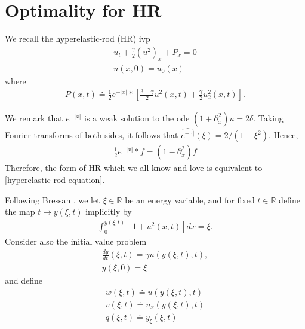 \documentclass[12pt,reqno]{amsart}
\numberwithin{equation}{section}  %
\numberwithin{figure}{section}
\newcommand{\rr}{\mathbb{R}}
\newcommand{\p}{\partial}
\begin{document}
\section{Optimality for HR} 
\label{sec:op-hr}
We recall the hyperelastic-rod (HR) ivp
\begin{gather}
    \label{hr}
    u_{t} + \frac{\gamma}{2}(u^{2})_{x} + P_{x} = 0
    \\
    \label{hr-data}
    u(x,0) = u_{0}(x)
\end{gather}
where
%
%
\begin{equation*}
\begin{split}
P(x,t) \doteq \frac{1}{2}e^{-| x |} * \left [\frac{3 - \gamma}{2}
    u^{2}(x,t) + \frac{\gamma}{2} u_{2}^{2}(x,t) \right ].
\end{split}
\end{equation*}
%
\begin{framed}
We remark that $e^{-| x |}$ is a weak solution to the ode $(1 + \p_{x}^{2})u =
2\delta$. Taking Fourier transforms of both sides, it follows that
$\widehat{e^{-| \cdot |}}(\xi) = 2/(1 + \xi^{2})$. Hence,
%
%
\begin{equation*}
\begin{split}
\frac{1}{2} e^{-| x |} * f = (1 - \p_{x}^2)f
\end{split}
\end{equation*}
%
%
Therefore, the form of HR which we all know and love is equivalent to
\eqref{hyperelastic-rod-equation}.
\end{framed}
%
Following Bressan \cite{Bressan_2007_Global-conserva}, we let $\xi \in \rr$ be an energy variable, and for fixed $t \in \rr$ define the map $t \mapsto y(\xi, t)$ implicitly by 
%
%
\begin{equation}
\label{potent-def}
\begin{split}
    \int_{0}^{y(\xi, t)} [1 + u^{2}(x,t)]dx = \xi.
\end{split}
\end{equation}
%
%
Consider also the initial value problem
%
%
\begin{gather}
    \label{en-eq}
\frac{dy}{dt}(\xi, t) = \gamma u(y(\xi, t), t),
\\
\label{en-data}
y(\xi, 0) = \xi
\end{gather}
%
%
and define
\begin{gather}
    \label{var-1}
    w(\xi, t) \doteq u(y(\xi, t), t)
    \\
    \label{var-2}
    v(\xi, t) \doteq u_{x}(y(\xi, t), t)
    \\
    \label{var-3}
    q(\xi, t) \doteq y_{\xi}(\xi, t)
\end{gather}
\end{document}
